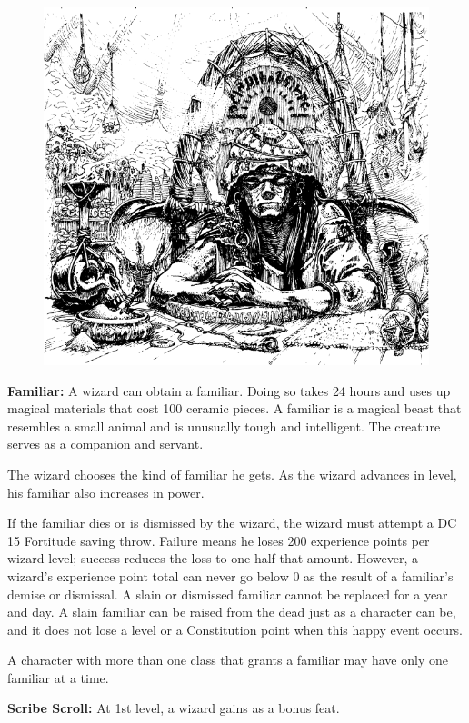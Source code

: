 \begin{figure}[b!]
\centering
\includegraphics[width=\textwidth]{images/wizard-5.png}
\end{figure}

\textbf{Familiar:} A wizard can obtain a familiar. Doing so takes 24 hours and uses up magical materials that cost 100 ceramic pieces. A familiar is a magical beast that resembles a small animal and is unusually tough and intelligent. The creature serves as a companion and servant.

The wizard chooses the kind of familiar he gets. As the wizard advances in level, his familiar also increases in power.

If the familiar dies or is dismissed by the wizard, the wizard must attempt a DC 15 Fortitude saving throw. Failure means he loses 200 experience points per wizard level; success reduces the loss to one-half that amount. However, a wizard's experience point total can never go below 0 as the result of a familiar's demise or dismissal. A slain or dismissed familiar cannot be replaced for a year and day. A slain familiar can be raised from the dead just as a character can be, and it does not lose a level or a Constitution point when this happy event occurs.

A character with more than one class that grants a familiar may have only one familiar at a time.

\textbf{Scribe Scroll:} At 1st level, a wizard gains  as a bonus feat.


